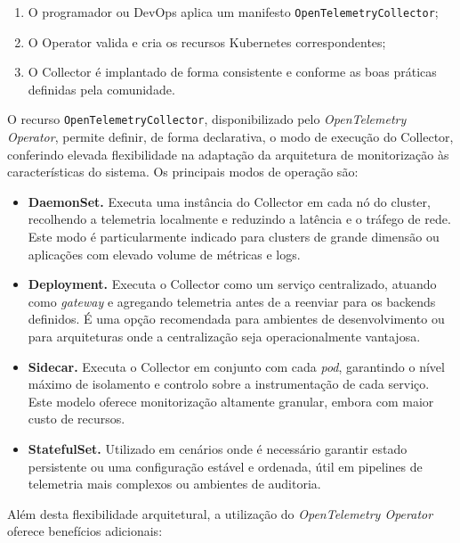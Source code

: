 \begin{enumerate}
\item O programador ou DevOps aplica um manifesto \texttt{OpenTelemetryCollector};
\item O Operator valida e cria os recursos Kubernetes correspondentes;
\item O Collector é implantado de forma consistente e conforme as boas práticas definidas pela comunidade.
\end{enumerate}


O recurso \texttt{OpenTelemetryCollector}, disponibilizado pelo \textit{OpenTelemetry Operator}, permite definir, de forma declarativa, o modo de execução do Collector, conferindo elevada flexibilidade na adaptação da arquitetura de monitorização às características do sistema. Os principais modos de operação são:

\begin{itemize}
    \item \textbf{DaemonSet.} Executa uma instância do Collector em cada nó do cluster, recolhendo a telemetria localmente e reduzindo a latência e o tráfego de rede. Este modo é particularmente indicado para clusters de grande dimensão ou aplicações com elevado volume de métricas e logs.

    \item \textbf{Deployment.} Executa o Collector como um serviço centralizado, atuando como \textit{gateway} e agregando telemetria antes de a reenviar para os backends definidos. É uma opção recomendada para ambientes de desenvolvimento ou para arquiteturas onde a centralização seja operacionalmente vantajosa.

    \item \textbf{Sidecar.} Executa o Collector em conjunto com cada \textit{pod}, garantindo o nível máximo de isolamento e controlo sobre a instrumentação de cada serviço. Este modelo oferece monitorização altamente granular, embora com maior custo de recursos.

    \item \textbf{StatefulSet.} Utilizado em cenários onde é necessário garantir estado persistente ou uma configuração estável e ordenada, útil em pipelines de telemetria mais complexos ou ambientes de auditoria.
\end{itemize}

Além desta flexibilidade arquitetural, a utilização do \textit{OpenTelemetry Operator} oferece benefícios adicionais:


